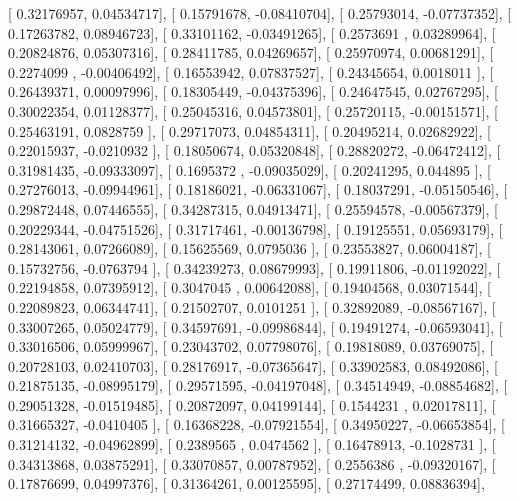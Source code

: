 \documentclass{article}
\begin{document}
       [ 0.32176957,  0.04534717],
       [ 0.15791678, -0.08410704],
       [ 0.25793014, -0.07737352],
       [ 0.17263782,  0.08946723],
       [ 0.33101162, -0.03491265],
       [ 0.2573691 ,  0.03289964],
       [ 0.20824876,  0.05307316],
       [ 0.28411785,  0.04269657],
       [ 0.25970974,  0.00681291],
       [ 0.2274099 , -0.00406492],
       [ 0.16553942,  0.07837527],
       [ 0.24345654,  0.0018011 ],
       [ 0.26439371,  0.00097996],
       [ 0.18305449, -0.04375396],
       [ 0.24647545,  0.02767295],
       [ 0.30022354,  0.01128377],
       [ 0.25045316,  0.04573801],
       [ 0.25720115, -0.00151571],
       [ 0.25463191,  0.0828759 ],
       [ 0.29717073,  0.04854311],
       [ 0.20495214,  0.02682922],
       [ 0.22015937, -0.0210932 ],
       [ 0.18050674,  0.05320848],
       [ 0.28820272, -0.06472412],
       [ 0.31981435, -0.09333097],
       [ 0.1695372 , -0.09035029],
       [ 0.20241295,  0.044895  ],
       [ 0.27276013, -0.09944961],
       [ 0.18186021, -0.06331067],
       [ 0.18037291, -0.05150546],
       [ 0.29872448,  0.07446555],
       [ 0.34287315,  0.04913471],
       [ 0.25594578, -0.00567379],
       [ 0.20229344, -0.04751526],
       [ 0.31717461, -0.00136798],
       [ 0.19125551,  0.05693179],
       [ 0.28143061,  0.07266089],
       [ 0.15625569,  0.0795036 ],
       [ 0.23553827,  0.06004187],
       [ 0.15732756, -0.0763794 ],
       [ 0.34239273,  0.08679993],
       [ 0.19911806, -0.01192022],
       [ 0.22194858,  0.07395912],
       [ 0.3047045 ,  0.00642088],
       [ 0.19404568,  0.03071544],
       [ 0.22089823,  0.06344741],
       [ 0.21502707,  0.0101251 ],
       [ 0.32892089, -0.08567167],
       [ 0.33007265,  0.05024779],
       [ 0.34597691, -0.09986844],
       [ 0.19491274, -0.06593041],
       [ 0.33016506,  0.05999967],
       [ 0.23043702,  0.07798076],
       [ 0.19818089,  0.03769075],
       [ 0.20728103,  0.02410703],
       [ 0.28176917, -0.07365647],
       [ 0.33902583,  0.08492086],
       [ 0.21875135, -0.08995179],
       [ 0.29571595, -0.04197048],
       [ 0.34514949, -0.08854682],
       [ 0.29051328, -0.01519485],
       [ 0.20872097,  0.04199144],
       [ 0.1544231 ,  0.02017811],
       [ 0.31665327, -0.0410405 ],
       [ 0.16368228, -0.07921554],
       [ 0.34950227, -0.06653854],
       [ 0.31214132, -0.04962899],
       [ 0.2389565 ,  0.0474562 ],
       [ 0.16478913, -0.1028731 ],
       [ 0.34313868,  0.03875291],
       [ 0.33070857,  0.00787952],
       [ 0.2556386 , -0.09320167],
       [ 0.17876699,  0.04997376],
       [ 0.31364261,  0.00125595],
       [ 0.27174499,  0.08836394],
\end{document}
